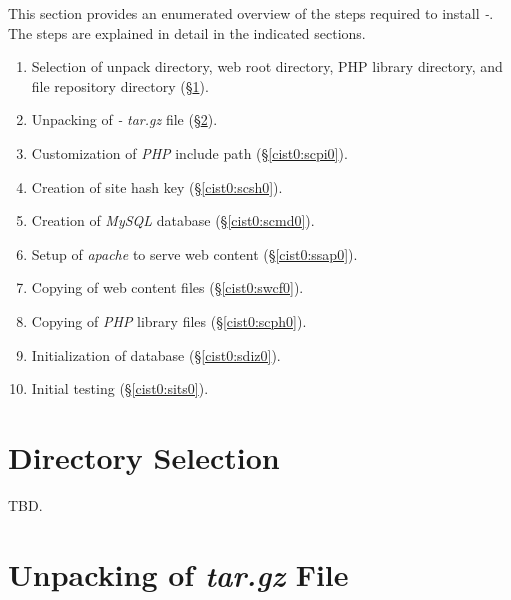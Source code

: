 This section provides an enumerated overview of the steps required to
install \emph{\productbasename{}-\productversion{}}.  The steps are explained
in detail in the indicated sections.

\begin{enumerate}
\item Selection of unpack directory, web root directory, 
      PHP library directory, and file repository directory  
      (\S{}\ref{cist0:sdse0}).
\item Unpacking of \emph{\productbasename{}-\productversion{}} 
      \emph{tar.gz} file  (\S{}\ref{cist0:sutz0}).
\item Customization of \emph{PHP} include path (\S{}\ref{cist0:scpi0}).
\item Creation of site hash key (\S{}\ref{cist0:scsh0}).
\item Creation of \emph{MySQL} database (\S{}\ref{cist0:scmd0}).
\item Setup of \emph{apache} to serve web content (\S{}\ref{cist0:ssap0}).
\item Copying of web content files (\S{}\ref{cist0:swcf0}).
\item Copying of \emph{PHP} library files (\S{}\ref{cist0:scph0}).
\item Initialization of database (\S{}\ref{cist0:sdiz0}).
\item Initial testing (\S{}\ref{cist0:sits0}).
\end{enumerate}


\section{Directory Selection}
\label{cist0:sdse0}

TBD.


\section{Unpacking of \emph{tar.gz} File}
\label{cist0:sutz0}

